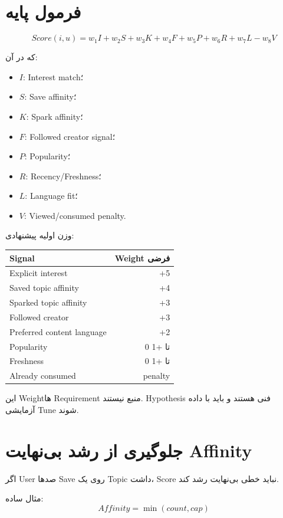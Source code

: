 \section{فرمول پایه}

\[
Score(i,u) =
w_1 I +
w_2 S +
w_3 K +
w_4 F +
w_5 P +
w_6 R +
w_7 L -
w_8 V
\]

که در آن:
\begin{itemize}
  \item \(I\): Interest match؛
  \item \(S\): Save affinity؛
  \item \(K\): Spark affinity؛
  \item \(F\): Followed creator signal؛
  \item \(P\): Popularity؛
  \item \(R\): Recency/Freshness؛
  \item \(L\): Language fit؛
  \item \(V\): Viewed/consumed penalty.
\end{itemize}

وزن اولیه پیشنهادی:
\begin{longtable}{p{6.8cm}r}
\toprule
Signal & Weight فرضی \\
\midrule
Explicit interest & +5 \\
Saved topic affinity & +4 \\
Sparked topic affinity & +3 \\
Followed creator & +3 \\
Preferred content language & +2 \\
Popularity & 0 تا +1 \\
Freshness & 0 تا +1 \\
Already consumed & penalty \\
\bottomrule
\end{longtable}

\begin{warningbox}
این Weightها Requirement منبع نیستند. Hypothesis فنی هستند و باید با داده آزمایشی Tune شوند.
\end{warningbox}

\section{جلوگیری از رشد بی‌نهایت Affinity}

اگر User صدها Save روی یک Topic داشت، Score نباید خطی بی‌نهایت رشد کند.

مثال ساده:
\[
Affinity = \min(count, cap)
\]

